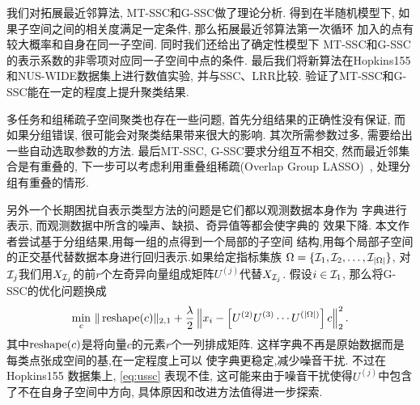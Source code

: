 我们对拓展最近邻算法, MT-SSC和G-SSC做了理论分析. 得到在半随机模型下,
如果子空间之间的相关度满足一定条件, 那么拓展最近邻算法第一次循环
加入的点有较大概率和自身在同一子空间. 同时我们还给出了确定性模型下
MT-SSC和G-SSC的表示系数的非零项对应同一子空间中点的条件.
最后我们将新算法在Hopkins155和NUS-WIDE数据集上进行数值实验,
并与SSC、LRR比较. 验证了MT-SSC和G-SSC能在一定的程度上提升聚类结果.

多任务和组稀疏子空间聚类也存在一些问题, 首先分组结果的正确性没有保证,
而如果分组错误, 很可能会对聚类结果带来很大的影响.
其次所需参数过多, 需要给出一些自动选取参数的方法.
最后MT-SSC, G-SSC要求分组互不相交, 然而最近邻集合是有重叠的,
下一步可以考虑利用重叠组稀疏(Overlap Group LASSO)~\cite{jacob2009group},
处理分组有重叠的情形.

另外一个长期困扰自表示类型方法的问题是它们都以观测数据本身作为
字典进行表示, 而观测数据中所含的噪声、缺损、奇异值等都会使字典的
效果下降. 本文作者尝试基于分组结果,用每一组的点得到一个局部的子空间
结构,用每个局部子空间的正交基代替数据本身进行回归表示.如果给定指标集族
\(\Omega=\{\mathcal{I}_1, \mathcal{I}_2, \ldots, \mathcal{I}_{|\Omega|}\}\),
对\(\mathcal{I}_j\)我们用\(X_{\mathcal{I}_j}\)的前\(r\)个左奇异向量组成矩阵\(U^{(j)}\)代替\(X_{\mathcal{I}_j}\).
假设\(i \in \mathcal{I}_1\), 那么将G-SSC的优化问题换成
\begin{equation}
  \min_{c} \, \|\operatorname{reshape}(c)\|_{2, 1}+\frac{\lambda}{2}
  \left\|x_i-\left[ U^{(2)} U^{(3)} \cdots U^{(|\Omega|)}\right]c\right\|_2^2.
  \label{eq:ussc}
\end{equation}
其中\(\operatorname{reshape}(c)\)是将向量\(c\)的元素\(r\)个一列排成矩阵.
这样字典不再是原始数据而是每类点张成空间的基,在一定程度上可以
使字典更稳定,减少噪音干扰. 不过在Hopkins155 数据集上, \eqref{eq:ussc} 表现不佳,
这可能来由于噪音干扰使得\(U^{(j)}\)中包含了不在自身子空间中方向,
具体原因和改进方法值得进一步探索.

